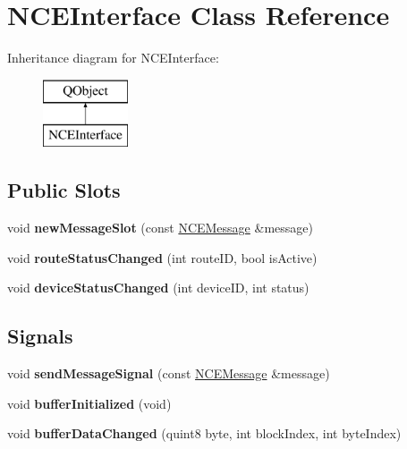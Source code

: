 \hypertarget{class_n_c_e_interface}{}\section{N\+C\+E\+Interface Class Reference}
\label{class_n_c_e_interface}
Inheritance diagram for N\+C\+E\+Interface\+:\begin{figure}[H]
\begin{center}
\leavevmode
\includegraphics[height=2.000000cm]{class_n_c_e_interface}
\end{center}
\end{figure}
\subsection*{Public Slots}
\begin{DoxyCompactItemize}
\item 
\mbox{\label{class_n_c_e_interface_a47932f97e62740e4734fc5a365462b96}} 
void {\bfseries new\+Message\+Slot} (const \hyperlink{class_n_c_e_message}{N\+C\+E\+Message} \&message)
\item 
\mbox{\label{class_n_c_e_interface_a61db42f2bacec3b7f7a234bab9f11899}} 
void {\bfseries route\+Status\+Changed} (int route\+ID, bool is\+Active)
\item 
\mbox{\label{class_n_c_e_interface_a50c72e4689a5a8fe07775cd8a5a00f09}} 
void {\bfseries device\+Status\+Changed} (int device\+ID, int status)
\end{DoxyCompactItemize}
\subsection*{Signals}
\begin{DoxyCompactItemize}
\item 
\mbox{\label{class_n_c_e_interface_a7bdaaf5c257df06fafd28579dd1fc594}} 
void {\bfseries send\+Message\+Signal} (const \hyperlink{class_n_c_e_message}{N\+C\+E\+Message} \&message)
\item 
\mbox{\label{class_n_c_e_interface_aeaa6c5acc594a5a439b9d208cce220c9}} 
void {\bfseries buffer\+Initialized} (void)
\item 
\mbox{\label{class_n_c_e_interface_a23b6a6c8d9b16d27c83ebaa7df0d762b}} 
void {\bfseries buffer\+Data\+Changed} (quint8 byte, int block\+Index, int byte\+Index)
\end{DoxyCompactItemize}
